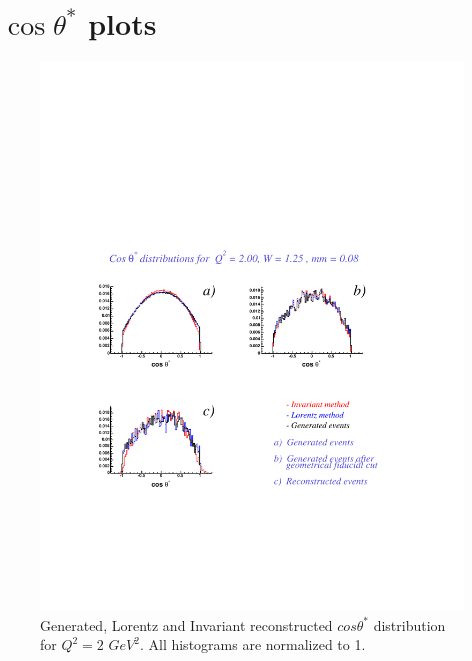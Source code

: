 \chapter{$\cos\theta^*$ plots}\label{sec:costhetaplots}


\begin{figure}[h]
    \begin{center}
        \includegraphics[width = 12cm, bb = 60 140 540 540]{appendix/img/ctheta_q22.00_W1.25_mm0.08}
        \caption{Generated, Lorentz and Invariant reconstructed $cos\theta^*$ distribution for $Q^2=2$ $GeV^2$.
        All histograms are normalized to 1.}
    \end{center}
\end{figure}
